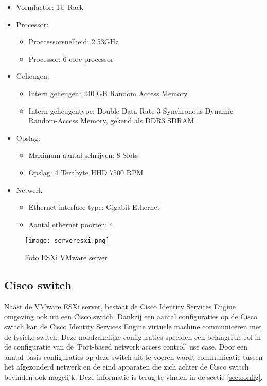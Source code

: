\begin{itemize}
	\item Vormfactor: 1U Rack
	\item Processor:
	\begin{itemize}
		\item Proccessorsnelheid: 2.53GHz
		\item Processor: 6-core processor
	\end{itemize}
	\item Geheugen:
	\begin{itemize}
		\item Intern geheugen: 240 GB Random Access Memory
		\item Intern geheugentype: Double Data Rate 3 Synchronous Dynamic Random-Access Memory, gekend als DDR3 SDRAM
	\end{itemize}
	\item Opslag:
	\begin{itemize}
		\item Maximum aantal schrijven: 8 Slots
		\item Opslag: 4 Terabyte HHD 7500 RPM
	\end{itemize}
	\item Netwerk
	\begin{itemize}
		\item Ethernet interface type: Gigabit Ethernet
		\item Aantal ethernet poorten: 4 
	\end{itemize}
\end{itemize}

\begin{figure}[H]
	\centering
	\texttt{[image: serveresxi.png]}
	\caption{Foto ESXi VMware server}
	\label{fig:VmwareSer}
\end{figure}

\subsection{Cisco switch}
Naast de VMware ESXi server, bestaat de Cisco Identity Services Engine omgeving ook uit een Cisco switch. Dankzij een aantal configuraties op de Cisco switch kan de Cisco Identity Services Engine virtuele machine communiceren met de fysieke switch. Deze noodzakelijke configuraties speelden een belangrijke rol in de configuratie van de 'Port-based network access control' use case. 
\newline
\newline
Door een aantal basis configuraties op deze switch uit te voeren wordt communicatie tussen het afgezonderd netwerk en de eind apparaten die zich achter de Cisco switch bevinden ook mogelijk. Deze informatie is terug te vinden in de sectie \ref{sec:config}.

